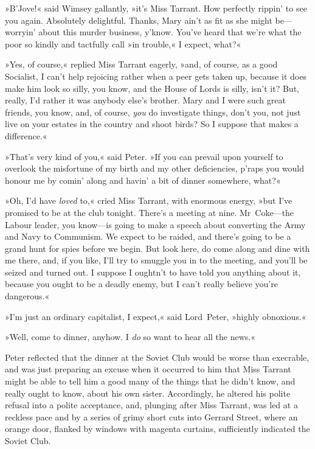 »B'Jove!« said Wimsey gallantly, »it's Miss Tarrant. How perfectly rippin' to see you again. Absolutely delightful. Thanks, Mary ain't as fit as she might be—worryin' about this murder business, y'know.  You've heard that we're what the poor so kindly and tactfully call »in trouble,« I expect, what?«

»Yes, of course,« replied Miss Tarrant eagerly, »and, of course, as a good Socialist, I can't help rejoicing rather when a peer gets taken up, because it does make him look so silly, you know, and the House of Lords is silly, isn't it? But, really, I'd rather it was anybody else's brother. Mary and I were such great friends, you know, and, of course, \textit{you} do investigate things, don't you, not just live on your estates in the country and shoot birds? So I suppose that makes a difference.«

»That's very kind of you,« said Peter. »If you can prevail upon yourself to overlook the misfortune of my birth and my other deficiencies, p'raps you would honour me by comin' along and havin' a bit of dinner somewhere, what?«

»Oh, I'd have \textit{loved} to,« cried Miss Tarrant, with enormous energy, »but I've promised to be at the club tonight. There's a meeting at nine. Mr~Coke—the Labour leader, you know—is going to make a speech about converting the Army and Navy to Communism. We expect to be raided, and there's going to be a grand hunt for spies before we begin.  But look here, do come along and dine with me there, and, if you like, I'll try to smuggle you in to the meeting, and you'll be seized and turned out. I suppose I oughtn't to have told you anything about it, because you ought to be a deadly enemy, but I can't really believe you're dangerous.«

»I'm just an ordinary capitalist, I expect,« said Lord~Peter, »highly obnoxious.«

»Well, come to dinner, anyhow. I \textit{do} so want to hear all the news.«

Peter reflected that the dinner at the Soviet Club would be worse than execrable, and was just preparing an excuse when it occurred to him that Miss Tarrant might be able to tell him a good many of the things that he didn't know, and really ought to know, about his own sister.  Accordingly, he altered his polite refusal into a polite acceptance, and, plunging after Miss Tarrant, was led at a reckless pace and by a series of grimy short cuts into Gerrard Street, where an orange door, flanked by windows with magenta curtains, sufficiently indicated the Soviet Club.

